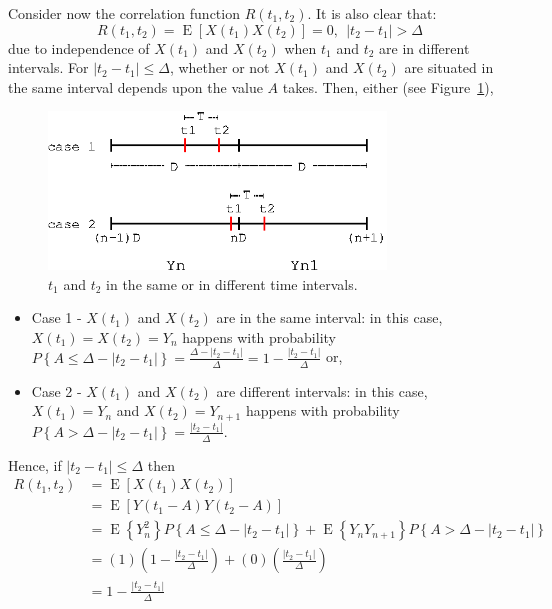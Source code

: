 \documentclass[12pt,letterpaper]{article}
\newcommand{\EE}{\operatorname{E}}
\begin{document}
Consider now the correlation function $R(t_1, t_2)$. It is also clear that: 
\begin{equation}
R(t_1, t_2) = \EE\left[X(t_1) X(t_2)\right] =0, \ \ \left|t_2 - t_1 \right| > \Delta \label{eq:2.60}
\end{equation} 
due to independence of $X(t_1)$ and $X(t_2)$ when $t_1$ and $t_2$ are in different intervals. For $\left|t_2 - t_1 \right| \leq \Delta$, whether or not $X(t_1)$ and $X(t_2)$ are situated in the same interval depends upon the value $A$ takes. Then, either (see Figure~\ref{fig:cases_binary_noise}),
\begin{figure}[!hb]
\centering
{}
\includegraphics[width=0.8\textwidth]{cases_binary_noise.eps}
\caption{$t_1$ and $t_2$ in the same or in different time intervals.}
\label{fig:cases_binary_noise}
\end{figure}
\begin{itemize}
 \item Case 1 - $X(t_1)$ and $X(t_2)$ are in the same interval: in this case, $X(t_1) = X(t_2) = Y_n$ happens with probability $P\left\{ A \leq \Delta - \left| t_2-t_1 \right| \right\} = \frac{\Delta - \left| t_2-t_1 \right|}{\Delta} = 1 - \frac{\left| t_2-t_1 \right|}{\Delta}$ or,
 \item Case 2 - $X(t_1)$ and $X(t_2)$ are different intervals: in this case, $X(t_1) = Y_n$ and $X(t_2) = Y_{n+1}$  happens with probability $P\left\{ A > \Delta - \left| t_2-t_1 \right| \right\} = \frac{\left| t_2-t_1 \right|}{\Delta}$.
\end{itemize}

Hence, if $\left|t_2 - t_1\right| \leq \Delta$ then
\begin{align}
R(t_1,t_2) &= \EE\left[X(t_1) X(t_2)\right] \\
&= \EE\left[Y(t_1 - A) Y(t_2-A)\right] \\
&= \EE\left\{Y_n^2  \right\} P\left\{ A \leq \Delta - \left| t_2-t_1 \right| \right\} + \EE\left\{Y_n Y_{n+1}  \right\} P\left\{ A > \Delta - \left| t_2-t_1 \right| \right\}\\
&= (1)\left(1-\frac{\left|t_2-t_1\right|}{\Delta}\right) + (0)\left(\frac{\left|t_2-t_1 \right|}{\Delta}\right) \\
&= 1 - \frac{\left| t_2-t_1 \right|}{\Delta} \label{eq:2.61}
\end{align}
\end{document}
